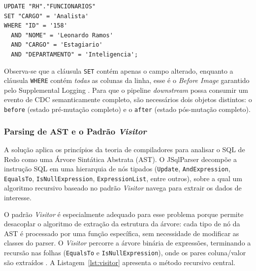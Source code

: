\documentclass[12pt]{article}
\begin{document}
\begin{lstlisting}[style=sqlstyle,
  caption={SQL de Redo gerado pelo Oracle LogMiner para uma operação de UPDATE.},
  label={lst:redosql}]
UPDATE "RH"."FUNCIONARIOS"
SET "CARGO" = 'Analista'
WHERE "ID" = '158'
  AND "NOME" = 'Leonardo Ramos'
  AND "CARGO" = 'Estagiario'
  AND "DEPARTAMENTO" = 'Inteligencia';
\end{lstlisting}

Observa-se que a cláusula \texttt{SET} contém apenas o campo alterado, enquanto
a cláusula \texttt{WHERE} contém \textit{todas} as colunas da linha, esse
é o \textit{Before Image} garantido pelo Supplemental Logging
\cite{oracle:2023}. Para que o pipeline \textit{downstream} possa consumir
um evento de CDC semanticamente completo, são necessários dois objetos
distintos: o \texttt{before} (estado pré-mutação completo) e o \texttt{after}
(estado pós-mutação completo).

\subsubsection{Parsing de AST e o Padrão \textit{Visitor}}

A solução aplica os princípios da teoria de compiladores \cite{aho:2006}
para analisar o SQL de Redo como uma Árvore Sintática Abstrata (AST).
O JSqlParser decompõe a instrução SQL em uma hierarquia de nós tipados
(\texttt{Update}, \texttt{AndExpression}, \texttt{EqualsTo},
\texttt{IsNullExpression}, \texttt{ExpressionList}, entre outros), sobre
a qual um algoritmo recursivo baseado no padrão \textit{Visitor} navega
para extrair os dados de interesse.

O padrão \textit{Visitor} é especialmente adequado para esse problema porque
permite desacoplar o algoritmo de extração da estrutura da árvore: cada tipo
de nó da AST é processado por uma função específica, sem necessidade de
modificar as classes do parser. O \textit{Visitor} percorre a árvore binária
de expressões, terminando a recursão nas folhas (\texttt{EqualsTo} e
\texttt{IsNullExpression}), onde os pares coluna/valor são extraídos
\cite{aho:2006}. A Listagem~\ref{lst:visitor} apresenta o método recursivo
central.
\end{document}
